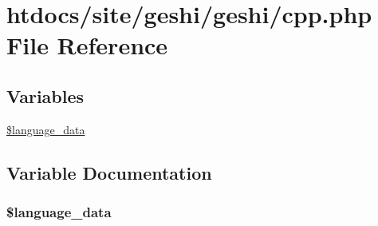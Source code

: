 \hypertarget{cpp_8php}{\section{htdocs/site/geshi/geshi/cpp.php File Reference}
\label{cpp_8php}
}
\subsection*{Variables}
\begin{DoxyCompactItemize}
\item 
\hyperlink{cpp_8php_a3f855a7e0ebc0899119af33dbb70d890}{\$language\-\_\-data}
\end{DoxyCompactItemize}


\subsection{Variable Documentation}
\hypertarget{cpp_8php_a3f855a7e0ebc0899119af33dbb70d890}{
\subsubsection[{\$language\-\_\-data}]{\setlength{\rightskip}{0pt plus 5cm}\$language\-\_\-data}}\label{cpp_8php_a3f855a7e0ebc0899119af33dbb70d890}
